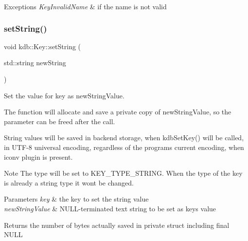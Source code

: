 \begin{DoxyExceptions}{Exceptions}
{\em Key\+Invalid\+Name} & if the name is not valid \\
\hline
\end{DoxyExceptions}
\mbox{\label{classkdb_1_1Key_ab97ef37aa235f0ae04dc6e6c21109d1a}} 
\subsubsection{\texorpdfstring{set\+String()}{setString()}}
{\footnotesize\ttfamily void kdb\+::\+Key\+::set\+String (\begin{DoxyParamCaption}\item[{std\+::string}]{new\+String }\end{DoxyParamCaption})\hspace{0.3cm}{\ttfamily [inline]}}



Set the value for {\ttfamily key} as {\ttfamily new\+String\+Value}. 

The function will allocate and save a private copy of {\ttfamily new\+String\+Value}, so the parameter can be freed after the call.

String values will be saved in backend storage, when kdb\+Set\+Key() will be called, in U\+T\+F-\/8 universal encoding, regardless of the program\textquotesingle{}s current encoding, when iconv plugin is present.

\begin{DoxyNote}{Note}
The type will be set to K\+E\+Y\+\_\+\+T\+Y\+P\+E\+\_\+\+S\+T\+R\+I\+NG. When the type of the key is already a string type it won\textquotesingle{}t be changed.
\end{DoxyNote}

\begin{DoxyParams}{Parameters}
{\em key} & the key to set the string value \\
\hline
{\em new\+String\+Value} & N\+U\+L\+L-\/terminated text string to be set as {\ttfamily key\textquotesingle{}s} value \\
\hline
\end{DoxyParams}
\begin{DoxyReturn}{Returns}
the number of bytes actually saved in private struct including final N\+U\+LL 
\end{DoxyReturn}


